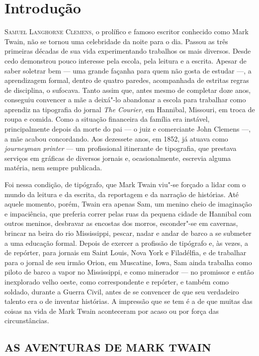 \chapter[Introdução, por Hanna Betina Gotz]{Introdução}


\textsc{Samuel Langhorne Clemens,} o prolífico e famoso escritor conhecido como Mark
Twain, não se tornou uma celebridade da noite para o dia. Passou as três
primeiras décadas de sua vida experimentando trabalhos os mais diversos.
Desde cedo demonstrou pouco interesse pela escola,
pela leitura e a escrita. Apesar de saber soletrar bem --- uma grande
façanha para quem não gosta de estudar ---, a aprendizagem formal, dentro de
quatro paredes, acompanhada de estritas regras de disciplina, o sufocava. Tanto assim que, antes mesmo de
completar doze anos, conseguiu convencer a mãe a deixá"-lo abandonar 
a escola para trabalhar como aprendiz na tipografia do jornal \textit{The Courier},
em Hannibal, Missouri, em troca de roupa e comida. Como a situação
financeira da família era instável, principalmente depois da morte do pai
--- o juiz e comerciante John Clemens ---, a mãe acabou concordando. Aos dezessete
anos, em 1852, já atuava como \textit{journeyman printer} --- um
profissional itinerante de tipografia, que prestava serviços em gráficas
de diversos jornais e, ocasionalmente, escrevia alguma matéria, nem
sempre publicada.

Foi nessa condição, de tipógrafo, que Mark Twain
viu"-se forçado a lidar com o mundo da leitura e da escrita, da reportagem
e da narração de histórias. Até aquele momento, porém, Twain era
apenas Sam, um menino cheio de imaginação e impaciência, que preferia
correr pelas ruas da pequena cidade de Hannibal com outros meninos,
desbravar as encostas dos morros, esconder"-se em cavernas, brincar na
beira do rio Mississippi, pescar, nadar e andar de barco a se submeter a
uma educação formal. Depois de exercer a profissão de tipógrafo e, às
vezes, a de repórter, para jornais em Saint Louis, Nova York e
Filadélfia, e de trabalhar para o jornal de seu irmão Orion, em
Muscatine, Iowa, Sam ainda trabalha como piloto de barco a vapor no
Mississippi, e como minerador --- no promissor e então inexplorado velho oeste,
como correspondente e repórter, e também como soldado, durante a Guerra
Civil, antes de se convencer de que seu verdadeiro talento era o de inventar
histórias. A impressão que se tem é a de que muitas das coisas na vida de
Mark Twain aconteceram por acaso ou por força das circunstâncias.

\section{AS AVENTURAS DE MARK TWAIN}

